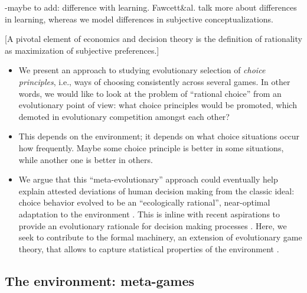 \documentclass[fleqn,reqno,11pt]{article}
\begin{document}
-maybe to add: difference with learning. Fawcett\&al. talk more about differences in learning, whereas we model differences in subjective conceptualizations.


[A pivotal element of economics and decision theory is the definition of rationality as
maximization of subjective preferences.]



\begin{itemize}
\item We present an approach to studying evolutionary selection of \emph{choice principles},
  i.e., ways of choosing consistently across several games. In other words, we would like to
  look at the problem of ``rational choice'' from an evolutionary point of view: what choice
  principles would be promoted, which demoted in evolutionary competition amongst each other?

\item This depends on the environment; it depends on what choice situations occur how
  frequently. Maybe some choice principle is better in some situations, while another one is
  better in others. 


\item We argue that this ``meta-evolutionary'' approach could eventually help explain attested
  deviations of human decision making from the classic ideal: choice behavior evolved to be
  an ``ecologically rational'', near-optimal adaptation to the environment
  \citep{Anderson1990:The-Adaptive-Ch,Anderson1991:Is-human-cognit,GigerenzerGoldstein1996:Reasoning-the-F,ChaterOaksford2000:The-Rational-An}. This
  is inline with recent aspirations to provide an evolutionary rationale for decision making
  processes
  \citep[e.g.,][]{HammersteinStevens2012:Six-Reasons-for,FawcettHamblin2013:Exposing-the-be}. Here,
  we seek to contribute to the formal machinery, an extension of evolutionary game theory, that
  allows to capture statistical properties of the environment
  \citep[cf.][]{McNamara2013:Towards-a-Riche}.
\end{itemize}



\subsection{The environment: meta-games}
\end{document}
